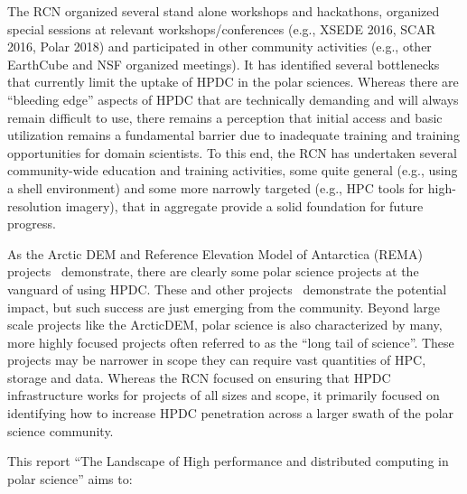 \documentclass[10pt,letterpaper,draft]{article}
\begin{document}
The RCN organized several stand alone workshops and hackathons, organized special sessions at relevant workshops/conferences (e.g., XSEDE 2016, SCAR 2016, Polar 2018) and participated in other community activities (e.g., other EarthCube and NSF organized meetings). It has identified several bottlenecks that currently limit the uptake of HPDC in the polar sciences. Whereas there are “bleeding edge” aspects of HPDC that are technically demanding and will always remain difficult to use, there remains a perception that initial access and basic utilization remains a fundamental barrier due to inadequate training and training opportunities for domain scientists. To this end, the RCN has undertaken several community-wide education and training activities, some quite general (e.g., using a shell environment) and some more narrowly targeted (e.g., HPC tools for high-resolution imagery), that in aggregate provide a solid foundation for future progress.

As the Arctic DEM and Reference Elevation Model of Antarctica (REMA) projects~\cite{Mimno2016-cw} demonstrate, there are clearly some polar science projects at the vanguard of using HPDC. These and other projects~\cite{Laws2007-dj} demonstrate the potential impact, but such success are just emerging from the community. Beyond large scale projects like the ArcticDEM, polar science is also characterized by many, more highly focused projects often referred to as the ``long tail of science''. These projects may be narrower in scope they can require vast quantities of HPC, storage and data. Whereas the RCN focused on ensuring that HPDC infrastructure works for projects of all sizes and scope, it primarily focused on identifying how to increase HPDC penetration across a larger swath of the polar science community. 

This report ``The Landscape of High performance and distributed computing in polar science'' aims to:
\end{document}
